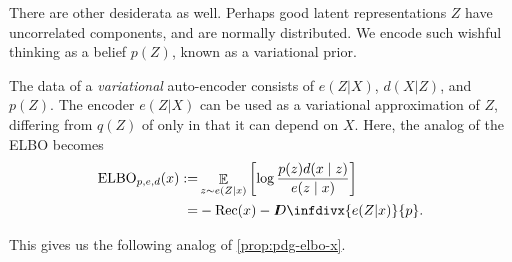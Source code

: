 \documentclass[twoside]{article}
\theoremstyle{plain}
\theoremstyle{definition}
\DeclareMathOperator*{\Ex}{\mathbb{E}} %
\newcommand{\thickD}{I\mkern-8muD}
\newcommand{\kldiv}{\thickD\infdivx}
\begin{document}
There are other desiderata as well. Perhaps good latent representations $Z$ have uncorrelated components, and are normally distributed.
We encode such wishful thinking as a belief $p(Z)$, known as a variational prior.

The data of a \emph{variational} auto-encoder
\parencite{kingma2013autoencoding}
consists of $e(Z|X)$, $d(X|Z)$, and $p(Z)$.
The encoder $e(Z|X)$ can be used as a variational approximation of $Z$, differing from $q(Z)$ of  only in that it can depend on $X$. Here, the analog of the ELBO becomes
\vspace{-0.5ex}
\begin{align*}
	\mathrm{ELBO}_{p,e,d}(x) :=&
		\Ex_{z \sim e(Z|x)} \left[\log \frac{p(z) d(x\mid z)}{e(z\mid x)} \right] \\
		=& - \mathrm{Rec}(x) - \kldiv{e(Z|x)}{p}.
\end{align*}
\vspace{-3ex}

This gives us the following analog of \cref{prop:pdg-elbo-x}.
\end{document}

